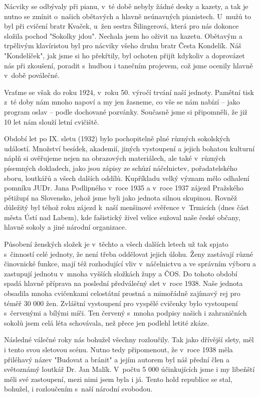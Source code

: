 \documentclass[a5paper, 12pt, twoside]{article}
\begin{document}
Nácviky se odbývaly při pianu, v~té době nebyly žádné desky a kazety, a
tak je nutno se zmínit o~našich obětavých a hlavně neúnavných
pianistech. U~mužů to byl při cvičení bratr Kvaček, u~žen sestra
Šilingerová, která pro nás dokonce složila pochod "Sokolky jdou".
Nechala jsem ho oživit na kazetu. Obětavým a trpělivým klavíristou byl
pro nácviky všeho druhu bratr Česta Kondelík. Náš "Kondelíček", jak
jsme si ho překřtily, byl ochoten přijít kdykoliv a doprovázet nás při
zkoušení, poradit s~hudbou i tanečním projevem, což jsme ocenily hlavně
v~době poválečné.

Vraťme se však do roku 1924, v~roku 50. výročí trvání naší jednoty.
Pamětní tisk z~té doby nám mnoho napoví a my jen žasneme, co vše se nám
nabízí -- jako program oslav -- podle dochované pozvánky. Současně jsme
si připomněli, že již 10 let nám slouží letní cvičiště.

Období let po IX. sletu (1932) bylo pochopitelně plné různých sokolských
událostí. Množství besídek, akademií, jiných vystoupení a jejich bohatou
kulturní náplň si ověřujeme nejen na obrazových materiálech, ale také
v~různých písemných dokladech, jako jsou zápisy ze schůzí náčelnictev,
pořadatelského sboru, loutkářů a všech dalších oddílů. Kupříkladu velký
význam mělo odhalení pomníku JUDr. Jana Podlipného v~roce 1935 a v~roce
1937 zájezd Pražského pětižupí na Slovensko, jehož jsme byli jako
jednota silnou skupinou. Rovněž důležitý byl téhož roku zájezd k~naší
menšinové svěřence v~Trmicích (dnes část města Ústí nad Labem), kde
fašistický živel velice sužoval naše české občany, hlavně sokoly a jiné
národní organizace.

Působení ženských složek je v~těchto a všech dalších letech už tak
spjato s~činností celé jednoty, že není třeba oddělovat jejich úlohu.
Ženy zastávají různé činovnické funkce, mají též rozhodující vliv
v~náčelnictvu a ve správním výboru a zastupují jednotu v~mnoha vyšších
složkách župy a ČOS. Do tohoto období spadá hlavně příprava na poslední
předválečný slet v~roce 1938. Naše jednota obsadila mnoha cvičenkami
celostátní prostná a mimořádně zajímavý rej pro téměř 30 000 žen.
Zvláštní vystoupení pro vyspělé cvičenky bylo vystoupení s~červenými a
bílými míči. Ten červený s~mnoha podpisy našich i zahraničních sokolů
jsem celá léta schovávala, než přece jen podlehl letité zkáze.

Následné válečné roky nás bohužel všechny rozloučily. Tak jako dřívější
slety, měl i tento svou sletovou scénu. Nutno tedy připomenout, že
v~roce 1938 měla přiléhavý název "Budovat a bránit" a jejím autorem byl
náš přední člen a světoznámý loutkář Dr. Jan Malík. V~počtu 5 000
účinkujících jsme i my libeňští měli své zastoupení, mezi nimi jsem byla
i já. Tento hold republice se stal, bohužel, i rozloučením s~naší
národní svobodou.
\end{document}
